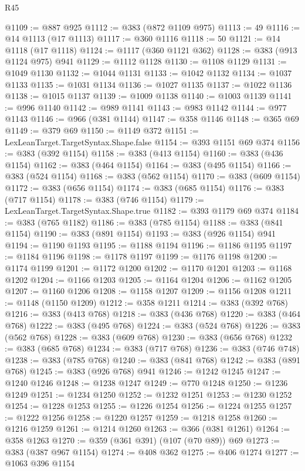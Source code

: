 \begin{lexlean}{R45}
\begin{coremodule}
@1109 := @887 @925
@1112 := @383 (@872 @1109 @975)
@1113 := 49
@1116 := @14 @1113 (@17 @1113)
@1117 := @360 @1116
@1118 := 50
@1121 := @14 @1118 (@17 @1118)
@1124 := @1117 (@360 @1121 @362)
@1128 := @383 (@913 @1124 @975) @941
@1129 := @1112 @1128
@1130 := @1108 @1129
@1131 := @1049 @1130
@1132 := @1044 @1131
@1133 := @1042 @1132
@1134 := @1037 @1133
@1135 := @1031 @1134
@1136 := @1027 @1135
@1137 := @1022 @1136
@1138 := @1015 @1137
@1139 := @1009 @1138
@1140 := @1003 @1139
@1141 := @996 @1140
@1142 := @989 @1141
@1143 := @983 @1142
@1144 := @977 @1143
@1146 := @966 (@381 @1144)
@1147 := @358 @1146
@1148 := @365 @69
@1149 := @379 @69
@1150 := @1149 @372
@1151 := LexLeanTarget.TargetSyntax.Shape.false
@1154 := @393 @1151 @69 @374
@1156 := @383 (@392 @1154)
@1158 := @383 (@413 @1154)
@1160 := @383 (@436 @1154)
@1162 := @383 (@464 @1154)
@1164 := @383 (@495 @1154)
@1166 := @383 (@524 @1154)
@1168 := @383 (@562 @1154)
@1170 := @383 (@609 @1154)
@1172 := @383 (@656 @1154)
@1174 := @383 (@685 @1154)
@1176 := @383 (@717 @1154)
@1178 := @383 (@746 @1154)
@1179 := LexLeanTarget.TargetSyntax.Shape.true
@1182 := @393 @1179 @69 @374
@1184 := @383 (@765 @1182)
@1186 := @383 (@785 @1154)
@1188 := @383 (@841 @1154)
@1190 := @383 (@891 @1154)
@1193 := @383 (@926 @1154) @941
@1194 := @1190 @1193
@1195 := @1188 @1194
@1196 := @1186 @1195
@1197 := @1184 @1196
@1198 := @1178 @1197
@1199 := @1176 @1198
@1200 := @1174 @1199
@1201 := @1172 @1200
@1202 := @1170 @1201
@1203 := @1168 @1202
@1204 := @1166 @1203
@1205 := @1164 @1204
@1206 := @1162 @1205
@1207 := @1160 @1206
@1208 := @1158 @1207
@1209 := @1156 @1208
@1211 := @1148 (@1150 @1209)
@1212 := @358 @1211
@1214 := @383 (@392 @768)
@1216 := @383 (@413 @768)
@1218 := @383 (@436 @768)
@1220 := @383 (@464 @768)
@1222 := @383 (@495 @768)
@1224 := @383 (@524 @768)
@1226 := @383 (@562 @768)
@1228 := @383 (@609 @768)
@1230 := @383 (@656 @768)
@1232 := @383 (@685 @768)
@1234 := @383 (@717 @768)
@1236 := @383 (@746 @748)
@1238 := @383 (@785 @768)
@1240 := @383 (@841 @768)
@1242 := @383 (@891 @768)
@1245 := @383 (@926 @768) @941
@1246 := @1242 @1245
@1247 := @1240 @1246
@1248 := @1238 @1247
@1249 := @770 @1248
@1250 := @1236 @1249
@1251 := @1234 @1250
@1252 := @1232 @1251
@1253 := @1230 @1252
@1254 := @1228 @1253
@1255 := @1226 @1254
@1256 := @1224 @1255
@1257 := @1222 @1256
@1258 := @1220 @1257
@1259 := @1218 @1258
@1260 := @1216 @1259
@1261 := @1214 @1260
@1263 := @366 (@381 @1261)
@1264 := @358 @1263
@1270 := @359 (@361 @391) (@107 (@70 @89)) @69
@1273 := @383 (@387 @967 @1154)
@1274 := @408 @362
@1275 := @406 @1274
@1277 := @1063 @396 @1154

\end{coremodule}
\end{lexlean}
